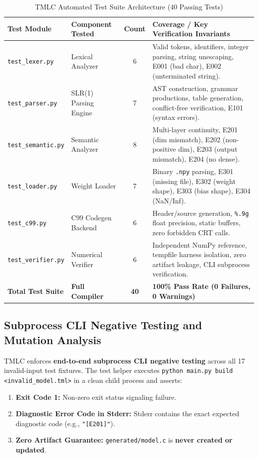 \documentclass[11pt,a4paper]{article}
\begin{document}
\begin{table}[htbp]
\centering
\small
\caption{TMLC Automated Test Suite Architecture (40 Passing Tests)}
\label{tab:test_suite_summary}
\begin{tabular}{llcp{6.5cm}}
\toprule
\textbf{Test Module} & \textbf{Component Tested} & \textbf{Count} & \textbf{Coverage / Key Verification Invariants} \\
\midrule
\texttt{test\_lexer.py}    & Lexical Analyzer          & 6              & Valid tokens, identifiers, integer parsing, string unescaping, E001 (bad char), E002 (unterminated string). \\
\texttt{test\_parser.py}   & SLR(1) Parsing Engine     & 7              & AST construction, grammar productions, table generation, conflict-free verification, E101 (syntax errors). \\
\texttt{test\_semantic.py} & Semantic Analyzer         & 8              & Multi-layer continuity, E201 (dim mismatch), E202 (non-positive dim), E203 (output mismatch), E204 (no dense). \\
\texttt{test\_loader.py}   & Weight Loader             & 7              & Binary \texttt{.npy} parsing, E301 (missing file), E302 (weight shape), E303 (bias shape), E304 (NaN/Inf). \\
\texttt{test\_c99.py}      & C99 Codegen Backend       & 6              & Header/source generation, \texttt{\%.9g} float precision, static buffers, zero forbidden CRT calls. \\
\texttt{test\_verifier.py} & Numerical Verifier        & 6              & Independent NumPy reference, tempfile harness isolation, zero artifact leakage, CLI subprocess verification. \\
\midrule
\textbf{Total Test Suite}  & \textbf{Full Compiler}    & \textbf{40}    & \textbf{100\% Pass Rate (0 Failures, 0 Warnings)} \\
\bottomrule
\end{tabular}
\end{table}

\subsection{Subprocess CLI Negative Testing and Mutation Analysis}
TMLC enforces \textbf{end-to-end subprocess CLI negative testing} across all 17 invalid-input test fixtures. The test helper executes \texttt{python main.py build <invalid\_model.tml>} in a clean child process and asserts:
\begin{enumerate}
    \item \textbf{Exit Code 1:} Non-zero exit status signaling failure.
    \item \textbf{Diagnostic Error Code in Stderr:} Stderr contains the exact expected diagnostic code (e.g., \texttt{"[E201]"}).
    \item \textbf{Zero Artifact Guarantee:} \texttt{generated/model.c} is \textbf{never created or updated}.
\end{enumerate}
\end{document}
